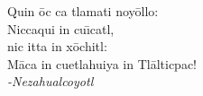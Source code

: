 
\vspace*{\fill}
\begin{flushright}
Quin \=oc ca tlamati noy\=ollo:\\
Niccaqui in cu{\=\i}catl,\\
nic itta in x\=ochitl:\\
M\=aca in cuetlahuiya in Tl\=alticpac!\\
\emph{-Nezahualcoyotl}\par
\end{flushright}
\vspace*{\fill}

